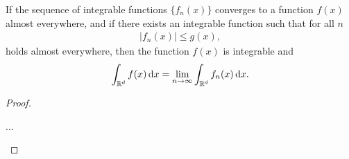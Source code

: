 \begin{theorem}[Lebesgue]
  If the sequence of integrable functions $\{f_n(x)\}$ converges
  to a function $f(x)$ almost everywhere, and if there exists an
  integrable function such that for all $n$
  \begin{gather*}
    \bigl|f_n(x)\bigr| \le g(x),
  \end{gather*}
  holds almost everywhere, then the function $f(x)$ is integrable and
  \begin{gather*}
    \int_{\mathbb R^d} f(x)\,\mathrm{d} x = \lim_{n\to\infty} \int_{\mathbb R^d} f_n(x)\,\mathrm{d} x.
  \end{gather*}
\end{theorem}

\begin{proof}
  \begin{todo}
    ...
  \end{todo}
\end{proof}

